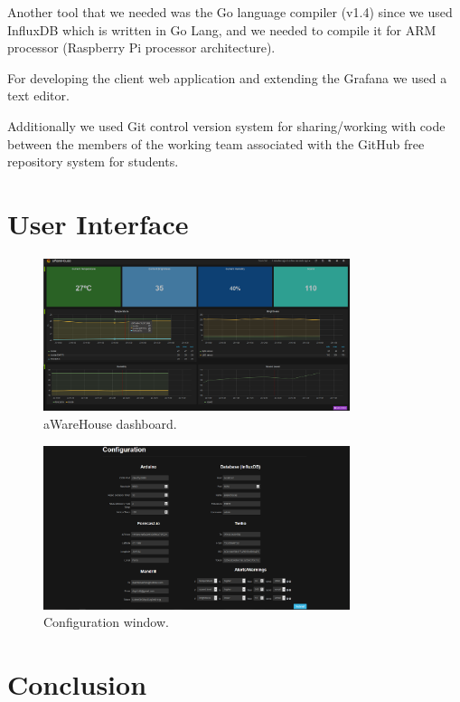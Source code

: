 \documentclass[12pt]{report}
\begin{document}
Another tool that we needed was the Go language compiler (v1.4) since we used InfluxDB which is written in Go Lang\cite{goinflux}, and we needed to compile it for ARM processor (Raspberry Pi processor architecture).

For developing the client web application and extending the Grafana we used a text editor.

Additionally we used Git control version system for sharing/working with code between the members of the working team associated with the GitHub free repository system for students.
\newpage
\chapter{User Interface}
\begin{figure}[H]
    \centering
    \includegraphics[width=0.8\textwidth]{img/main.png}
    \caption{aWareHouse dashboard.}
    \label{fig:main}
\end{figure}
\begin{figure}[H]
    \centering
    \includegraphics[width=0.8\textwidth]{img/config.png}
    \caption{Configuration window.}
    \label{fig:config}
\end{figure}

\newpage
\chapter{Conclusion}
\end{document}
